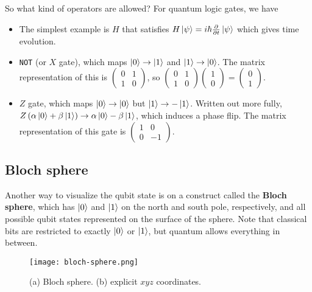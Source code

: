\documentclass[12pt, english]{book}
\begin{document}
So what kind of operators are allowed?
For quantum logic gates, we have
\begin{itemize}
	\item The simplest example is $H$ that satisfies $H \ket{\psi} = i \hbar \pdv{t} \ket{\psi}$ which gives time evolution.
	
	\item \texttt{NOT} (or $X$ gate), which maps $\ket{0} \rightarrow \ket{1}$ and $\ket{1} \rightarrow \ket{0}$.
	The matrix representation of this is $\begin{pmatrix} 0 & 1 \\ 1 & 0 \end{pmatrix}$, so $\begin{pmatrix} 0 & 1 \\ 1 & 0 \end{pmatrix} \begin{pmatrix} 1 \\ 0 \end{pmatrix} = \begin{pmatrix} 0 \\ 1 \end{pmatrix}$.
	
	\item $Z$ gate, which maps $\ket{0} \rightarrow \ket{0}$ but $\ket{1} \rightarrow -\ket{1}$.
	Written out more fully, $Z \left( \alpha \ket{0} + \beta \ket{1} \right) \rightarrow \alpha \ket{0} - \beta \ket{1}$, which induces a phase flip. 
	The matrix representation of this gate is $\begin{pmatrix} 1 & 0 \\ 0 & -1 \end{pmatrix}$.
\end{itemize}


\subsection{Bloch sphere}

Another way to visualize the qubit state is on a construct called the \textbf{Bloch sphere}, which has $\ket{0}$ and $\ket{1}$ on the north and south pole, respectively, and all possible qubit states represented on the surface of the sphere.
Note that classical bits are restricted to exactly $\ket{0}$ or $\ket{1}$, but quantum allows everything in between.

\begin{figure}[!ht]
	\centering
	\texttt{[image: bloch-sphere.png]}
	\caption{(a) Bloch sphere. (b) explicit $xyz$ coordinates.}
	\label{fig:bloch-sphere}
\end{figure}
\end{document}
